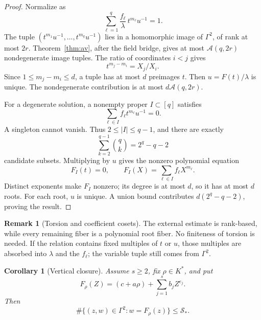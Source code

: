 \documentclass[11pt]{article}
\newtheorem{corollary}[theorem]{Corollary}
\theoremstyle{definition}
\newtheorem{remark}[theorem]{Remark}
\newcommand{\Acal}{\mathcal A}
\newcommand{\Scal}{\mathcal S}
\newcommand{\card}{\#}
\begin{document}
\begin{proof}
Normalize as
\begin{equation}
 \sum_{\ell=1}^{q}
 \frac{f_\ell}{\lambda}\,t^{m_\ell}u^{-1}=1.
 \label{eq:sparse-normalized}
\end{equation}
The tuple \((t^{m_1}u^{-1},\ldots,t^{m_q}u^{-1})\) lies in a homomorphic image of \(\Gamma^2\), of rank at most \(2r\). Theorem~\ref{thm:av}, after the field bridge, gives at most \(\Acal(q,2r)\) nondegenerate image tuples. The ratio of coordinates \(i<j\) gives
\begin{equation}
 t^{m_j-m_i}=X_j/X_i.
 \label{eq:power-recovery}
\end{equation}
Since \(1\leq m_j-m_i\leq d\), a tuple has at most \(d\) preimages \(t\). Then \(u=F(t)/\lambda\) is unique. The nondegenerate contribution is at most \(d\Acal(q,2r)\).

For a degenerate solution, a nonempty proper \(I\subset[q]\) satisfies
\begin{equation}
 \sum_{\ell\in I}f_\ell t^{m_\ell}u^{-1}=0.
 \label{eq:sparse-degenerate}
\end{equation}
A singleton cannot vanish. Thus \(2\leq|I|\leq q-1\), and there are exactly
\[
 \sum_{k=2}^{q-1}\binom qk=2^q-q-2
\]
candidate subsets. Multiplying by \(u\) gives the nonzero polynomial equation
\[
 F_I(t)=0,\qquad F_I(X)=\sum_{\ell\in I}f_\ell X^{m_\ell}.
\]
Distinct exponents make \(F_I\) nonzero; its degree is at most \(d\), so it has at most \(d\) roots. For each root, \(u\) is unique. A union bound contributes \(d(2^q-q-2)\), proving the result.
\end{proof}

\begin{remark}[Torsion and coefficient cosets]
\label{rem:torsion-cosets}
The external estimate is rank-based, while every remaining fiber is a polynomial root fiber. No finiteness of torsion is needed. If the relation contains fixed multiples of \(t\) or \(u\), those multiples are absorbed into \(\lambda\) and the \(f_\ell\); the variable tuple still comes from \(\Gamma^2\).
\end{remark}

\begin{corollary}[Vertical closure]
\label{cor:vertical}
Assume \(s\geq2\), fix \(\rho\in K^*\), and put
\begin{equation}
 F_\rho(Z)=(c+a\rho)+\sum_{j=1}^{s}b_jZ^{e_j}.
 \label{eq:vertical-polynomial}
\end{equation}
Then
\[
 \card\{(z,w)\in\Gamma^2:w=F_\rho(z)\}\leq\Scal_*.
\]
\end{corollary}
\end{document}
